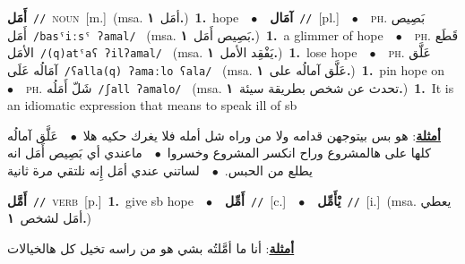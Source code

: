\documentclass[10pt,a4paper,twoside]{article} %
\begin{document}
\begin{multicols}{2}
{\setlength\topsep{0pt}\textbf{\foreignlanguage{arabic}{أَمَل}}\ {\color{gray}\texttt{//}\color{black}}\ \textsc{noun}\ [m.]\ \color{gray}(msa. \foreignlanguage{arabic}{أمَل}~\foreignlanguage{arabic}{\textbf{١.}})\color{black}\ \textbf{1.}~hope\ \ $\bullet$\ \ \setlength\topsep{0pt}\textbf{\foreignlanguage{arabic}{آمَال}}\ {\color{gray}\texttt{//}\color{black}}\ [pl.]\ \ $\bullet$\ \ \textsc{ph.} \color{gray} \foreignlanguage{arabic}{بَصِيص أَمَل}\color{black}\ {\color{gray}\texttt{/{\sffamily basˤiːsˤ ʔamal}/}\color{black}}\ \color{gray} (msa. \foreignlanguage{arabic}{بَصِيص أَمَل}~\foreignlanguage{arabic}{\textbf{١.}})\color{black}\ \textbf{1.}~a glimmer of hope\ \ $\bullet$\ \ \textsc{ph.} \color{gray} \foreignlanguage{arabic}{قَطَع الأمَل}\color{black}\ {\color{gray}\texttt{/{\sffamily (q)atˤaʕ ʔilʔamal}/}\color{black}}\ \color{gray} (msa. \foreignlanguage{arabic}{يَفْقِد الأمل}~\foreignlanguage{arabic}{\textbf{١.}})\color{black}\ \textbf{1.}~lose hope\ \ $\bullet$\ \ \textsc{ph.} \color{gray} \foreignlanguage{arabic}{عَلَّق آمَالُه عَلَى}\color{black}\ {\color{gray}\texttt{/{\sffamily ʕalla(q) ʔamaːlo ʕala}/}\color{black}}\ \color{gray} (msa. \foreignlanguage{arabic}{عَلَّق آمالُه على}~\foreignlanguage{arabic}{\textbf{١.}})\color{black}\ \textbf{1.}~pin hope on\ \ $\bullet$\ \ \textsc{ph.} \color{gray} \foreignlanguage{arabic}{شَلّ أَمَلُه}\color{black}\ {\color{gray}\texttt{/{\sffamily ʃall ʔamalo}/}\color{black}}\ \color{gray} (msa. \foreignlanguage{arabic}{تحدث عن شخص بطريقة سيئة}~\foreignlanguage{arabic}{\textbf{١.}})\color{black}\ \textbf{1.}~It is an idiomatic expression that means to speak ill of sb\  \begin{flushright}\color{gray}\foreignlanguage{arabic}{\textbf{\underline{\foreignlanguage{arabic}{أمثلة}}}: هو بس بيتوجهن قدامه ولا من وراه شل أمله فلا يغرك حكيه هلا\ $\bullet$\ \  عَلَّق آمالُه كلها على هالمشروع وراح انكسر المشروع وخسروا\ $\bullet$\ \  ماعندي أي بَصِيص أَمَل انه يطلع من الحبس.\ $\bullet$\ \  لساتني عندي أمَل إِنه نلتقي مرة ثانية}\end{flushright}\color{black}} \vspace{2mm}

{\setlength\topsep{0pt}\textbf{\foreignlanguage{arabic}{أَمَّل}}\ {\color{gray}\texttt{//}\color{black}}\ \textsc{verb}\ [p.]\ \textbf{1.}~give sb hope\ \ $\bullet$\ \ \setlength\topsep{0pt}\textbf{\foreignlanguage{arabic}{أَمِّل}}\ {\color{gray}\texttt{//}\color{black}}\ [c.]\ \ $\bullet$\ \ \setlength\topsep{0pt}\textbf{\foreignlanguage{arabic}{يْأَمِّل}}\ {\color{gray}\texttt{//}\color{black}}\ [i.]\ \color{gray}(msa. \foreignlanguage{arabic}{يعطي أمَل لشخص}~\foreignlanguage{arabic}{\textbf{١.}})\color{black}\  \begin{flushright}\color{gray}\foreignlanguage{arabic}{\textbf{\underline{\foreignlanguage{arabic}{أمثلة}}}: أنا ما أمَّلتُه بشي هو من راسه تخيل كل هالخيالات}\end{flushright}\color{black}} \vspace{2mm}


\end{multicols}
\end{document}
